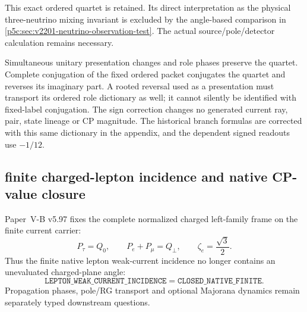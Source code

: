 \documentclass[12pt,a4paper]{article}
\begin{document}
\begin{remark}
\label{p5c:rem:v2201-quartet-observation-scope}
This exact ordered quartet is retained. Its direct interpretation as the
physical three-neutrino mixing invariant is excluded by the angle-based
comparison in \ref{p5c:sec:v2201-neutrino-observation-test}. The actual
source/pole/detector calculation remains necessary.
\end{remark}

Simultaneous unitary presentation changes and role phases preserve the
quartet. Complete conjugation of the fixed ordered packet conjugates the
quartet and reverses its imaginary part. A rooted reversal used as a
presentation must transport its ordered role dictionary as well; it cannot
silently be identified with fixed-label conjugation. The sign correction
changes no generated current ray, pair, state lineage or CP magnitude.
The historical branch formulas are corrected with this same dictionary
in the appendix, and the dependent signed readouts use $-1/12$.






\subsection{finite charged-lepton incidence and native CP-value closure}
\label{p5c:sec:v277-lepton-cp-value-closure}
Paper~V-B v5.97 fixes the complete normalized charged left-family frame on the
finite current carrier:
\[
 P_\tau=Q_0,
 \qquad P_e+P_\mu=Q_\perp,
 \qquad
 \boxed{\zeta_e=\frac{\sqrt3}{2}.}
\]
Thus the finite native lepton weak-current incidence no longer contains an
unevaluated charged-plane angle:
\[
 \boxed{\texttt{LEPTON\_WEAK\_CURRENT\_INCIDENCE}
 =\texttt{CLOSED\_NATIVE\_FINITE}.}
\]
Propagation phases, pole/RG transport and optional Majorana dynamics remain
separately typed downstream questions.
\end{document}
